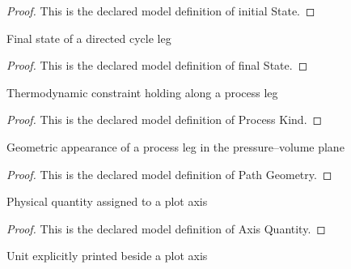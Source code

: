 \begin{proof}
  This is the declared model definition of initial State.
\end{proof}
\begin{definition}
  \label{def:physics:phyx-mini-0479:phyxminiproblems-problemphyxmini0479-cycleleg-finalstate}
  Final state of a directed cycle leg
\end{definition}
\begin{proof}
  This is the declared model definition of final State.
\end{proof}
\begin{definition}
  \label{def:physics:phyx-mini-0479:phyxminiproblems-problemphyxmini0479-processkind}
  Thermodynamic constraint holding along a process leg
\end{definition}
\begin{proof}
  This is the declared model definition of Process Kind.
\end{proof}
\begin{definition}
  \label{def:physics:phyx-mini-0479:phyxminiproblems-problemphyxmini0479-pathgeometry}
  Geometric appearance of a process leg in the pressure--volume plane
\end{definition}
\begin{proof}
  This is the declared model definition of Path Geometry.
\end{proof}
\begin{definition}
  \label{def:physics:phyx-mini-0479:phyxminiproblems-problemphyxmini0479-axisquantity}
  Physical quantity assigned to a plot axis
\end{definition}
\begin{proof}
  This is the declared model definition of Axis Quantity.
\end{proof}
\begin{definition}
  \label{def:physics:phyx-mini-0479:phyxminiproblems-problemphyxmini0479-axisunit}
  Unit explicitly printed beside a plot axis
\end{definition}
